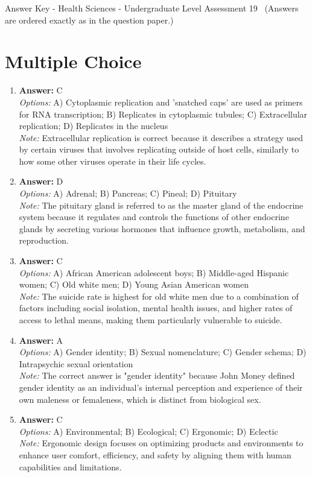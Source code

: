 \documentclass[12pt]{article}
\begin{document}
\begin{center}
Answer Key - Health Sciences - Undergraduate Level Assessment 19 \
\small (Answers are ordered exactly as in the question paper.)
\end{center}

\section*{Multiple Choice}
\begin{enumerate}[label=\arabic*.]
\item \textbf{Answer:} C
\\ \textit{Options:} A) Cytoplasmic replication and 'snatched caps' are used as primers for RNA transcription; B) Replicates in cytoplasmic tubules; C) Extracellular replication; D) Replicates in the nucleus
\\ \textit{Note:} Extracellular replication is correct because it describes a strategy used by certain viruses that involves replicating outside of host cells, similarly to how some other viruses operate in their life cycles.
\item \textbf{Answer:} D
\\ \textit{Options:} A) Adrenal; B) Pancreas; C) Pineal; D) Pituitary
\\ \textit{Note:} The pituitary gland is referred to as the master gland of the endocrine system because it regulates and controls the functions of other endocrine glands by secreting various hormones that influence growth, metabolism, and reproduction.
\item \textbf{Answer:} C
\\ \textit{Options:} A) African American adolescent boys; B) Middle-aged Hispanic women; C) Old white men; D) Young Asian American women
\\ \textit{Note:} The suicide rate is highest for old white men due to a combination of factors including social isolation, mental health issues, and higher rates of access to lethal means, making them particularly vulnerable to suicide.
\item \textbf{Answer:} A
\\ \textit{Options:} A) Gender identity; B) Sexual nomenclature; C) Gender schema; D) Intrapsychic sexual orientation
\\ \textit{Note:} The correct answer is "gender identity" because John Money defined gender identity as an individual's internal perception and experience of their own maleness or femaleness, which is distinct from biological sex.
\item \textbf{Answer:} C
\\ \textit{Options:} A) Environmental; B) Ecological; C) Ergonomic; D) Eclectic
\\ \textit{Note:} Ergonomic design focuses on optimizing products and environments to enhance user comfort, efficiency, and safety by aligning them with human capabilities and limitations.
\end{enumerate}
\end{document}
